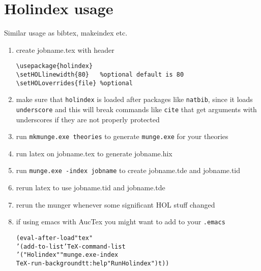 \documentclass{scrartcl}
\begin{document}
\section{Holindex usage}

Similar usage as bibtex, makeindex etc.

\begin{enumerate}
\item create jobname.tex with header
\begin{verbatim}
\usepackage{holindex}
\setHOLlinewidth{80}   %optional default is 80
\setHOLoverrides{file} %optional
\end{verbatim}
\item make sure that \texttt{holindex} is loaded after packages like
  \texttt{natbib}, since it loads \texttt{underscore} and this will
  break commands like \texttt{cite} that get arguments with
  underscores if they are not properly protected
\item run \texttt{mkmunge.exe theories} to generate \texttt{munge.exe}
  for your theories
\item run latex on jobname.tex to generate jobname.hix
\item run \texttt{munge.exe -index jobname} to create jobname.tde and jobname.tid
\item rerun latex to use jobname.tid and jobname.tde
\item rerun the munger whenever some significant HOL stuff changed
\item if using emacs with AucTex you might want to add to your \texttt{.emacs}
\begin{alltt}
(eval-after-load "tex"
  '(add-to-list 'TeX-command-list
    '("Holindex" "munge.exe -index %s"
       TeX-run-background t t :help "Run Holindex") t))
\end{alltt}
\end{enumerate}
\end{document}

